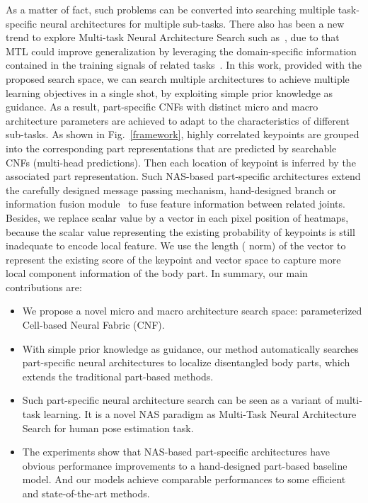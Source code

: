 \documentclass[journal]{IEEEtran}
\begin{document}
As a matter of fact, such problems can be converted into searching multiple task-specific neural architectures for multiple sub-tasks. There also has been a new trend to explore Multi-task Neural Architecture Search such as~\cite{liang2018evolutionary,newell2019feature,gao2020mtl}, due to that MTL could improve generalization by leveraging the domain-specific information contained in the training signals of related tasks~\cite{caruana1998multitask}. In this work, provided with the proposed search space, we can search multiple architectures to achieve multiple learning objectives in a single shot, by exploiting simple prior knowledge as guidance.  As a result, part-specific CNFs with distinct micro and macro architecture parameters are achieved to adapt to the characteristics of different sub-tasks. As shown in Fig.~\ref{framework}, highly correlated keypoints are grouped into the corresponding part representations that are predicted by searchable CNFs (multi-head predictions). Then each location of keypoint is inferred by the associated part representation. Such NAS-based part-specific architectures extend the carefully designed message passing mechanism, hand-designed branch or information fusion module~\cite{Chu_2016_CVPR,Tang_2019_CVPR, li2014heterogeneous} to fuse feature information between related joints. Besides, we replace scalar value by a vector in each pixel position of heatmaps, because the scalar value representing the existing probability of keypoints is still inadequate to encode local feature. We use the length ( norm) of the vector to represent the existing score of the keypoint and vector space to capture more local component information of the body part. In summary, our main contributions are: 
 
 
\begin{itemize}
	\item We propose a novel micro and macro architecture search space: parameterized Cell-based Neural Fabric (CNF).
	\item With simple prior knowledge as guidance, our method automatically searches part-specific neural architectures to localize disentangled body parts, which extends the traditional part-based methods.
	\item Such part-specific neural architecture search can be seen as a variant of multi-task learning. It is a novel NAS paradigm as Multi-Task Neural Architecture Search for human pose estimation task.
	\item The experiments show that NAS-based part-specific architectures have obvious performance improvements to a hand-designed part-based baseline model. And our models achieve comparable performances to some efficient and state-of-the-art methods.

\end{itemize}
\end{document}
